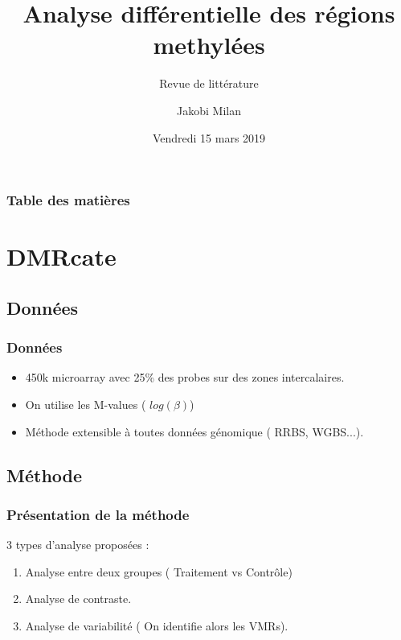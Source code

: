\documentclass{beamer}
\begin{document}
\title[identification DMRs] %
{Analyse différentielle des régions methylées}
\subtitle{Revue de littérature}
\author{Jakobi Milan}
\date[KPT 2004]{Vendredi 15 mars 2019}






\frame{\titlepage}

\begin{frame}
\frametitle{Table des matières}
\tableofcontents
\end{frame}


\section{DMRcate}
\subsection{Données}

\begin{frame}
\frametitle{Données}
\begin{itemize}
\item<1-> 450k microarray avec 25\% des probes sur des zones intercalaires.
\item<1-> On utilise les M-values ( $log(\beta)$)
\item<2-> Méthode extensible à toutes données génomique ( RRBS, WGBS...).

\end{itemize}
\end{frame}

\subsection{Méthode}
\begin{frame}
\frametitle{Présentation de la méthode}
3 types d'analyse proposées :
\begin{enumerate}
\item<2-> Analyse entre deux groupes ( Traitement vs Contrôle)
\item<2-> Analyse de contraste.
\item<2-> Analyse de variabilité ( On identifie alors les VMRs).
\end{enumerate}
\end{frame}
\end{document}
